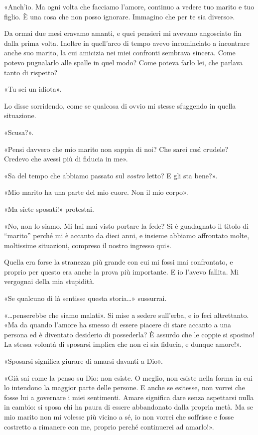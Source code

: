 \documentclass[a4paper,10pt]{memoir}
\begin{document}
«Anch'io. Ma ogni volta che facciamo l'amore, continuo a vedere tuo marito e tuo figlio. È una cosa che non posso
ignorare. Immagino che per te sia diverso».

Da ormai due mesi eravamo amanti, e quei pensieri mi avevano angosciato fin dalla prima volta. Inoltre in quell'arco di
tempo avevo incominciato a incontrare anche suo marito, la cui amicizia nei miei confronti sembrava sincera. Come potevo
pugnalarlo alle spalle in quel modo? Come poteva farlo lei, che parlava tanto di rispetto?

«Tu sei un idiota».

Lo disse sorridendo, come se qualcosa di ovvio mi stesse sfuggendo in quella situazione.

«Scusa?».

«Pensi davvero che mio marito non sappia di noi? Che sarei così crudele? Credevo che avessi più di fiducia in me».

«Sa del tempo che abbiamo passato sul \emph{vostro} letto? E gli sta bene?».

«Mio marito ha una parte del mio cuore. Non il mio corpo».

«Ma siete sposati!» protestai.

«No, non lo siamo. Mi hai mai visto portare la fede? Si è guadagnato il titolo di ``marito'' perché mi è accanto da
dieci anni, e insieme abbiamo affrontato molte, moltissime situazioni, compreso il nostro ingresso qui».

Quella era forse la stranezza più grande con cui mi fossi mai confrontato, e proprio per questo era anche la prova più
importante. E io l'avevo fallita. Mi vergognai della mia stupidità.

«Se qualcuno di là sentisse questa storia\dots{}» sussurrai.

«\dots{}penserebbe che siamo malati». Si mise a sedere sull'erba, e io feci altrettanto. «Ma da quando l'amore ha smesso
di essere piacere di stare accanto a una persona ed è diventato desiderio di possederla? È assurdo che le coppie si
sposino! La stessa volontà di sposarsi implica che non ci sia fiducia, e dunque amore!».

«Sposarsi significa giurare di amarsi davanti a Dio».

«Già sai come la penso su Dio: non esiste. O meglio, non esiste nella forma in cui lo intendono la maggior parte delle
persone. E anche se esitesse, non vorrei che fosse lui a governare i miei sentimenti. Amare significa dare senza
aspettarsi nulla in cambio: si sposa chi ha paura di essere abbandonato dalla propria metà. Ma se mio marito non mi
volesse più vicino a sé, io non vorrei che soffrisse e fosse costretto a rimanere con me, proprio perché continuerei ad
amarlo!».
\end{document}
